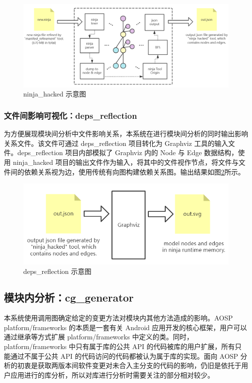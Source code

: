 \begin{figure}
    \centering
    \includegraphics[width=.8\textwidth]{figures/archi-ninja-hacked.png}
    \caption{ninja\_hacked 示意图}
    \label{fig:archi-ninja-hacked}
\end{figure}

\subsubsection{文件间影响可视化：deps\_reflection}

为方便展现模块间分析中文件影响关系，本系统在进行模块间分析的同时输出影响关系文件。该文件可通过 deps\_reflection 项目转化为 Graphviz 工具的输入文件。deps\_reflection 项目内部模拟了 Graphviz 内的 Node 与 Edge 数据结构，使用 ninja\_hacked 项目的输出文件作为输入，将其中的文件视作节点，将文件与文件间的依赖关系视为边，使用传统有向图构建依赖关系图。输出结果如图\ref{fig:archi-deps-reflection}所示。

\begin{figure}
    \centering
    \includegraphics[width=.8\textwidth]{figures/archi-deps-reflection.png}
    \caption{deps\_reflection 示意图}
    \label{fig:archi-deps-reflection}
\end{figure}

\subsection{模块内分析：cg\_generator}

本系统使用调用图确定给定的变更方法对模块内其他方法造成的影响。AOSP platform/frameworks 的本质是一套有关 Android 应用开发的核心框架，用户可以通过继承等方式扩展 platform/frameworks 中定义的类。同时，platform/frameworks 中只有属于库的公共 API 的代码被库的用户扩展，所有只能通过不属于公共 API 的代码访问的代码都被认为属于库的实现。\cite{CALLGRAPHCONSTRUCTION}面向 AOSP 分析的初衷是获取两版本间软件变更对未合入主分支的代码的影响，仍旧是依托于用户应用进行的库分析，所以对库进行分析时需要关注的部分相对较少。

